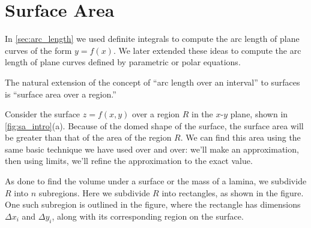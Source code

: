 \section{Surface Area}\label{sec:surface_area}

In \autoref{sec:arc_length} we used definite integrals to compute the arc length of plane curves of the form $y=f(x)$. We later extended these ideas to compute the arc length of plane curves defined by parametric or polar equations. 

The natural extension of the concept of ``arc length over an interval'' to surfaces is ``surface area over a region.'' 

Consider the surface $z=f(x,y)$ over a region $R$ in the $x$-$y$ plane, shown in \autoref{fig:sa_intro}(a). Because of the domed shape of the surface, the surface area will be greater than that of the area of the region $R$. We can find this area using the same basic technique we have used over and over: we'll make an approximation, then using limits, we'll refine the approximation to the exact value.


As done to find the volume under a surface or the mass of a lamina, we subdivide $R$ into $n$ subregions. Here we subdivide $R$ into rectangles, as shown in the figure. One such subregion is outlined in the figure, where the rectangle has dimensions $\Delta x_i$ and $\Delta y_i$, along with its corresponding region on the surface.

